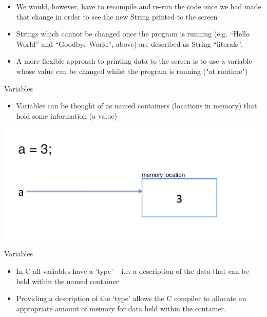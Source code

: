 \documentclass{beamer}
\begin{document}
\begin{frame}[fragile]

\begin{itemize}
\item We would, however, have to recompile and re-run the code once we had made that change in order to see the new
String printed to the screen
\item Strings which cannot be changed once the program is running (e.g. ``Hello World'' and ``Goodbye World'', above)
are described as String ``literals''.
\end{itemize}
\end{frame}

\begin{frame}
\begin{itemize}
\item A more flexible approach to printing data to the screen is to use a variable whose value can be changed whilst the program is running ("at runtime")
\end{itemize}
\end{frame} 

\begin{frame}[fragile]
Variables
\begin{itemize}
\item Variables can be thought of as named containers (locations in memory) that hold some information (a value)
\end{itemize}
\includegraphics[scale=0.5]{Slide2.png}
\end{frame}

\begin{frame}[fragile]
Variables
\begin{itemize}
\item In C all variables have a 'type' -- i.e. a description of the data that can be held within the named container
\item Providing a description of the `type' allows the C compiler to allocate an appropriate amount of memory for data held within the container.
\end{itemize}
\end{frame}
\end{document}
